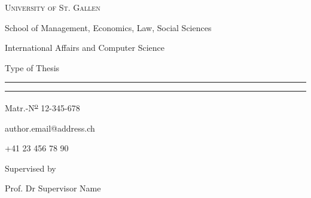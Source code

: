 \begin{titlepage}
    \begin{center}
        \large
        \vspace*{.5\baselineskip}
        
            {\Large\scshape University of St. Gallen}
            
            School of Management, Economics, Law, Social Sciences
    
            International Affairs and Computer Science
            
        \vspace{\fill}
            
            Type of Thesis
            
        \vspace{-.5\baselineskip}
            
            \rule{4.25in}{0.5pt}
            
        \vspace{.5\baselineskip}
    
            {\LARGE\scshape\thetitle}
            
            \rule{4.25in}{0.5pt}
    
            \thedate
    
        \vspace{\fill}
            
            \theauthor
            
            Matr.-N\textsuperscript{\underline{\scriptsize o}} 12-345-678
    
            author.email@address.ch
            
            +41 23 456 78 90
    
        \vspace{\fill}
            
            Supervised by
            
            Prof. Dr Supervisor Name
    
        \vspace{\fill}
    \end{center}
\end{titlepage}